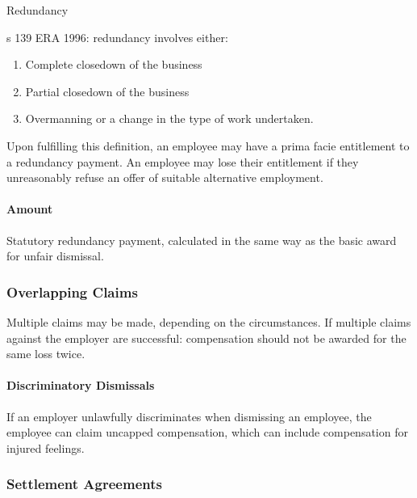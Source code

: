 \documentclass[
]{article}
\providecommand{\tightlist}{%
  \setlength{\itemsep}{0pt}\setlength{\parskip}{0pt}}
\newenvironment{env-640a6022-8ee7-4d36-bbe0-3d3b60e6082e}
{
    \savenotes\tcolorbox[blanker,breakable,left=5pt,borderline west={2pt}{-4pt}{gold}]
}
{
    \endtcolorbox\spewnotes
}
\begin{document}
\begin{env-640a6022-8ee7-4d36-bbe0-3d3b60e6082e}

Redundancy

s 139 ERA 1996: redundancy involves either:

\begin{enumerate}
\tightlist
\item
  Complete closedown of the business
\item
  Partial closedown of the business
\item
  Overmanning or a change in the type of work undertaken.
\end{enumerate}

\end{env-640a6022-8ee7-4d36-bbe0-3d3b60e6082e}

Upon fulfilling this definition, an employee may have a prima facie
entitlement to a redundancy payment. An employee may lose their
entitlement if they unreasonably refuse an offer of suitable alternative
employment.

\hypertarget{amount}{%
\paragraph{Amount}\label{amount}}

Statutory redundancy payment, calculated in the same way as the basic
award for unfair dismissal.

\hypertarget{overlapping-claims}{%
\subsubsection{Overlapping Claims}\label{overlapping-claims}}

Multiple claims may be made, depending on the circumstances. If multiple
claims against the employer are successful: compensation should not be
awarded for the same loss twice.

\hypertarget{discriminatory-dismissals}{%
\paragraph{Discriminatory Dismissals}\label{discriminatory-dismissals}}

If an employer unlawfully discriminates when dismissing an employee, the
employee can claim uncapped compensation, which can include compensation
for injured feelings.

\hypertarget{settlement-agreements}{%
\subsubsection{Settlement Agreements}\label{settlement-agreements}}
\end{document}
